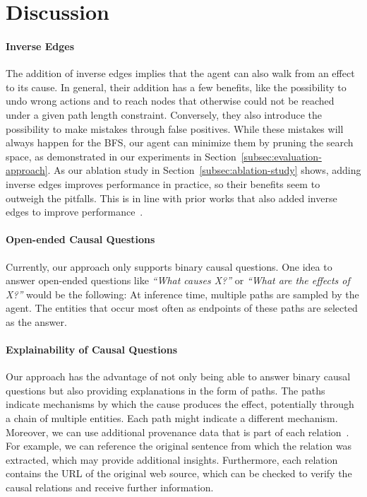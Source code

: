 \section{Discussion}
\label{sec:discussion}
\paragraph{Inverse Edges}
The addition of inverse edges implies that the agent can also walk from an effect to its cause. In general, their addition has a few benefits, like the possibility to undo wrong actions and to reach nodes that otherwise could not be reached under a given path length constraint. Conversely, they also introduce the possibility to make mistakes through false positives. While these mistakes will always happen for the BFS, our agent can minimize them by pruning the search space, as demonstrated in our experiments in Section~\ref{subsec:evaluation-approach}. As our ablation study in Section~\ref{subsec:ablation-study} shows, adding inverse edges improves performance in practice, so their benefits seem to outweigh the pitfalls. This is in line with prior works that also added inverse edges to improve performance~\cite{Xiong2017DeePpath,Das2018Minerva}.

\paragraph{Open-ended Causal Questions}
Currently, our approach only supports binary causal questions. One idea to answer open-ended questions like \textit{``What causes X?''} or \textit{``What are the effects of X?''} would be the following: At inference time, multiple paths are sampled by the agent.
The entities that occur most often as endpoints of these paths are selected as the answer.

\paragraph{Explainability of Causal Questions}
Our approach has the advantage of not only being able to answer binary causal questions but also providing explanations in the form of paths. The paths indicate mechanisms by which the cause produces the effect, potentially through a chain of multiple entities. Each path might indicate a different mechanism. Moreover, we can use additional provenance data that is part of each relation~\cite{Heindorf2020Causenet}. For example, we can reference the original sentence from which the relation was extracted, which may provide additional insights. Furthermore, each relation contains the URL of the original web source, which can be checked to verify the causal relations and receive further information.

